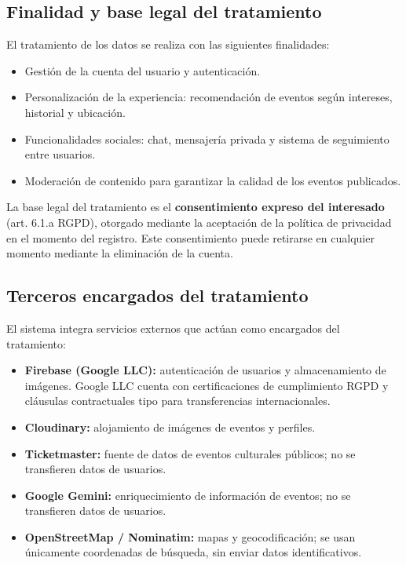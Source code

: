 \subsection{Finalidad y base legal del tratamiento}

El tratamiento de los datos se realiza con las siguientes finalidades:

\begin{itemize}
    \item Gestión de la cuenta del usuario y autenticación.
    \item Personalización de la experiencia: recomendación de eventos según intereses, historial y ubicación.
    \item Funcionalidades sociales: chat, mensajería privada y sistema de seguimiento entre usuarios.
    \item Moderación de contenido para garantizar la calidad de los eventos publicados.
\end{itemize}

La base legal del tratamiento es el \textbf{consentimiento expreso del interesado} (art. 6.1.a RGPD), otorgado mediante la aceptación de la política de privacidad en el momento del registro. Este consentimiento puede retirarse en cualquier momento mediante la eliminación de la cuenta.

\subsection{Terceros encargados del tratamiento}

El sistema integra servicios externos que actúan como encargados del tratamiento:

\begin{itemize}
    \item \textbf{Firebase (Google LLC):} autenticación de usuarios y almacenamiento de imágenes. Google LLC cuenta con certificaciones de cumplimiento RGPD y cláusulas contractuales tipo para transferencias internacionales.
    \item \textbf{Cloudinary:} alojamiento de imágenes de eventos y perfiles.
    \item \textbf{Ticketmaster:} fuente de datos de eventos culturales públicos; no se transfieren datos de usuarios.
    \item \textbf{Google Gemini:} enriquecimiento de información de eventos; no se transfieren datos de usuarios.
    \item \textbf{OpenStreetMap / Nominatim:} mapas y geocodificación; se usan únicamente coordenadas de búsqueda, sin enviar datos identificativos.
\end{itemize}


